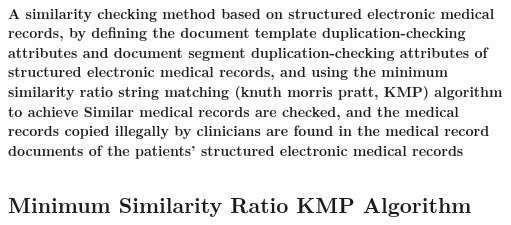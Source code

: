 \documentclass{article}
\begin{document}
\paragraph{A similarity checking method based on structured electronic medical records, by defining the document template duplication-checking attributes and document segment duplication-checking attributes of structured electronic medical records, and using the minimum similarity ratio string matching (knuth morris pratt, KMP) algorithm to achieve Similar medical records are checked, and the medical records copied illegally by clinicians are found in the medical record documents of the patients' structured electronic medical records}
\subsection{Minimum Similarity Ratio KMP Algorithm}
\end{document}
